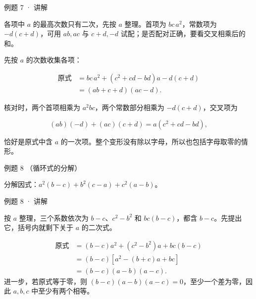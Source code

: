 \begin{solution}{例题 7 · 讲解}

\think 各项中 $a$ 的最高次数只有二次，先按 $a$ 整理。首项为 $bc\,a^2$，常数项为 $-d(c+d)$，可用 $ab,ac$ 与 $c+d,-d$ 试配；是否配对正确，要看交叉相乘后的和。

\solve 先按 $a$ 的次数收集各项：

\begin{align*}
\text{原式}&=bc\,a^2+(c^2+cd-bd)a-d(c+d)\\
&=(ab+c+d)(ac-d).
\end{align*}

核对时，两个首项相乘为 $a^2bc$，两个常数部分相乘为 $-d(c+d)$，交叉项为

\[
(ab)(-d)+(ac)(c+d)=a(c^2+cd-bd),
\]

恰好是原式中含 $a$ 的一次项。整个变形没有除以字母，所以也包括字母取零的情形。


\end{solution}


\begin{problem}{例题 8 （循环式的分解）}

分解因式：$a^2(b-c)+b^2(c-a)+c^2(a-b)$。

\end{problem}


\begin{solution}{例题 8 · 讲解}

\think 按 $a$ 整理，三个系数依次为 $b-c$、$c^2-b^2$ 和 $bc(b-c)$，都含 $b-c$。先提出它，括号内就剩下关于 $a$ 的二次式。

\solve \begin{align*}
\text{原式}&=(b-c)a^2+(c^2-b^2)a+bc(b-c)\\
&=(b-c)[a^2-(b+c)a+bc]\\
&=(b-c)(a-b)(a-c).
\end{align*}
进一步，若原式等于零，则 $(b-c)(a-b)(a-c)=0$，至少一个差为零，因此 $a,b,c$ 中至少有两个相等。


\end{solution}


